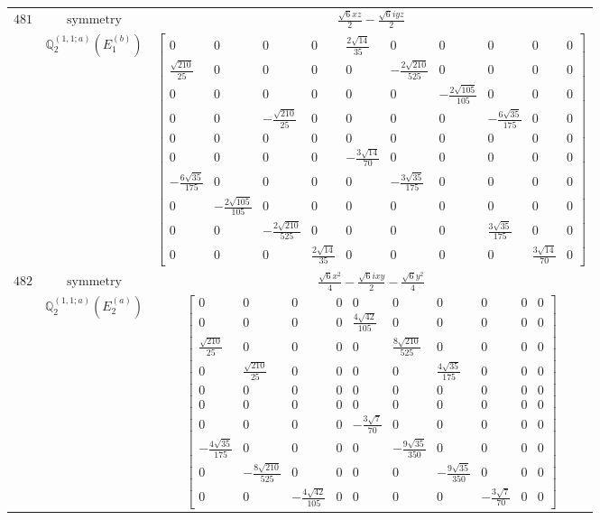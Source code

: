 \documentclass[fleqn,8pt,landscape]{jsarticle}
\begin{document}
\begin{longtable}{ccc}
$ 481 $ & $ \text{symmetry} $ & $ \frac{\sqrt{6} x z}{2} - \frac{\sqrt{6} i y z}{2} $ \\
$  $ & $ \mathbb{Q}_{2}^{(1,1;a)}(E_{1}^{(b)}) $ & $ \begin{bmatrix} 0 & 0 & 0 & 0 & \frac{2 \sqrt{14}}{35} & 0 & 0 & 0 & 0 & 0 \\ \frac{\sqrt{210}}{25} & 0 & 0 & 0 & 0 & - \frac{2 \sqrt{210}}{525} & 0 & 0 & 0 & 0 \\ 0 & 0 & 0 & 0 & 0 & 0 & - \frac{2 \sqrt{105}}{105} & 0 & 0 & 0 \\ 0 & 0 & - \frac{\sqrt{210}}{25} & 0 & 0 & 0 & 0 & - \frac{6 \sqrt{35}}{175} & 0 & 0 \\ 0 & 0 & 0 & 0 & 0 & 0 & 0 & 0 & 0 & 0 \\ 0 & 0 & 0 & 0 & - \frac{3 \sqrt{14}}{70} & 0 & 0 & 0 & 0 & 0 \\ - \frac{6 \sqrt{35}}{175} & 0 & 0 & 0 & 0 & - \frac{3 \sqrt{35}}{175} & 0 & 0 & 0 & 0 \\ 0 & - \frac{2 \sqrt{105}}{105} & 0 & 0 & 0 & 0 & 0 & 0 & 0 & 0 \\ 0 & 0 & - \frac{2 \sqrt{210}}{525} & 0 & 0 & 0 & 0 & \frac{3 \sqrt{35}}{175} & 0 & 0 \\ 0 & 0 & 0 & \frac{2 \sqrt{14}}{35} & 0 & 0 & 0 & 0 & \frac{3 \sqrt{14}}{70} & 0 \end{bmatrix} $ \\ \hline
$ 482 $ & $ \text{symmetry} $ & $ \frac{\sqrt{6} x^{2}}{4} - \frac{\sqrt{6} i x y}{2} - \frac{\sqrt{6} y^{2}}{4} $ \\
$  $ & $ \mathbb{Q}_{2}^{(1,1;a)}(E_{2}^{(a)}) $ & $ \begin{bmatrix} 0 & 0 & 0 & 0 & 0 & 0 & 0 & 0 & 0 & 0 \\ 0 & 0 & 0 & 0 & \frac{4 \sqrt{42}}{105} & 0 & 0 & 0 & 0 & 0 \\ \frac{\sqrt{210}}{25} & 0 & 0 & 0 & 0 & \frac{8 \sqrt{210}}{525} & 0 & 0 & 0 & 0 \\ 0 & \frac{\sqrt{210}}{25} & 0 & 0 & 0 & 0 & \frac{4 \sqrt{35}}{175} & 0 & 0 & 0 \\ 0 & 0 & 0 & 0 & 0 & 0 & 0 & 0 & 0 & 0 \\ 0 & 0 & 0 & 0 & 0 & 0 & 0 & 0 & 0 & 0 \\ 0 & 0 & 0 & 0 & - \frac{3 \sqrt{7}}{70} & 0 & 0 & 0 & 0 & 0 \\ - \frac{4 \sqrt{35}}{175} & 0 & 0 & 0 & 0 & - \frac{9 \sqrt{35}}{350} & 0 & 0 & 0 & 0 \\ 0 & - \frac{8 \sqrt{210}}{525} & 0 & 0 & 0 & 0 & - \frac{9 \sqrt{35}}{350} & 0 & 0 & 0 \\ 0 & 0 & - \frac{4 \sqrt{42}}{105} & 0 & 0 & 0 & 0 & - \frac{3 \sqrt{7}}{70} & 0 & 0 \end{bmatrix} $ \\ \hline

\end{longtable}
\end{document}
